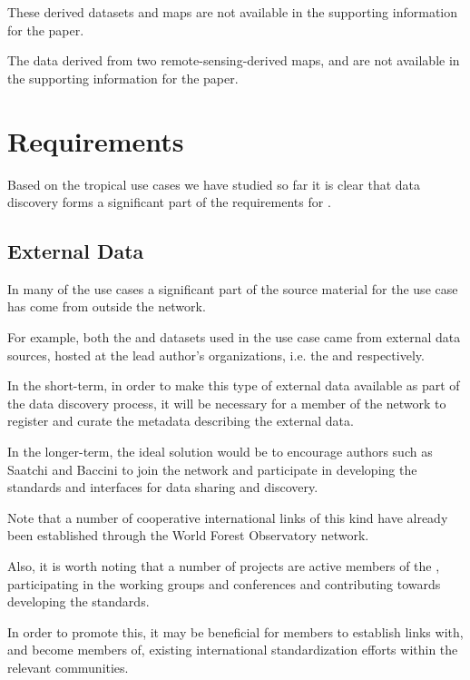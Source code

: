 \documentclass{article}
\begin{document}
These derived datasets and maps are not available in the supporting
information for the paper.

The \cite{term-agb} data derived from two remote-sensing-derived maps,
\cite{saatchi-2011} and \cite{baccini-2012} are not available in the
supporting information for the paper.

\section{\cite{tropo} Requirements}

Based on the tropical use cases we have studied so far it is clear that
data discovery forms a significant part of the requirements for \cite{tropo}.

\subsection{External Data}

In many of the use cases a significant part of the source material for
the use case has come from outside the \cite{tropo} network.

For example, both the \cite{saatchi-2011} and \cite{baccini-2012}
datasets used in the \cite{mitchard-2014} use case came from external
data sources, hosted at the lead author's organizations, i.e. the
 and  respectively.

In the short-term, in order to make this type of external data available
as part of the \cite{tropo} data discovery process, it will be necessary
for a member of the \cite{tropo} network to register and curate the
metadata describing the external data.

In the longer-term, the ideal solution would be to encourage authors such
as Saatchi and Baccini to join the \cite{tropo} network and participate in
developing the standards and \cite{web-service} interfaces for data sharing
and discovery.

Note that a number of cooperative international links of this kind have
already been established through the World Forest Observatory network.

Also, it is worth noting that a number of \cite{nasa} projects are active
members of the \cite{ivoa}, participating in the working groups and
conferences and contributing towards developing the \cite{ivoa} standards.

In order to promote this, it may be beneficial for \cite{atrop} members to
establish links with, and become members of,
existing international standardization efforts within the
relevant communities.
 
\end{document}
